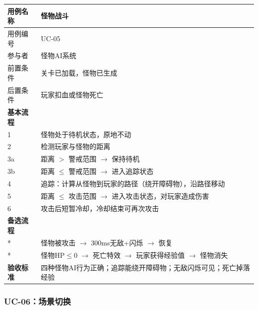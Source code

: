 \documentclass[12pt,a4paper]{article}
\begin{document}
\begin{table}[htbp]
\centering
\begin{tabularx}{\textwidth}{lX}
\toprule
\textbf{用例名称} & 怪物战斗 \\
\midrule
用例编号 & UC-05 \\
参与者 & 怪物AI系统 \\
前置条件 & 关卡已加载，怪物已生成 \\
后置条件 & 玩家扣血或怪物死亡 \\
\midrule
\textbf{基本流程} & \\
1 & 怪物处于待机状态，原地不动 \\
2 & 检测玩家与怪物的距离 \\
3a & 距离 $>$ 警戒范围 $\rightarrow$ 保持待机 \\
3b & 距离 $\leq$ 警戒范围 $\rightarrow$ 进入追踪状态 \\
4 & 追踪：计算从怪物到玩家的路径（绕开障碍物），沿路径移动 \\
5 & 距离 $\leq$ 攻击范围 $\rightarrow$ 进入攻击状态，对玩家造成伤害 \\
6 & 攻击后短暂冷却，冷却结束可再次攻击 \\
\midrule
\textbf{备选流程} & \\
* & 怪物被攻击 $\rightarrow$ 300ms无敌+闪烁 $\rightarrow$ 恢复 \\
* & 怪物HP$\leq$0 $\rightarrow$ 死亡特效 $\rightarrow$ 玩家获得经验值 $\rightarrow$ 怪物消失 \\
\midrule
\textbf{验收标准} & 四种怪物AI行为正确；追踪能绕开障碍物；无敌闪烁可见；死亡掉落经验 \\
\bottomrule
\end{tabularx}
\end{table}

\subsubsection{UC-06：场景切换}
\end{document}
